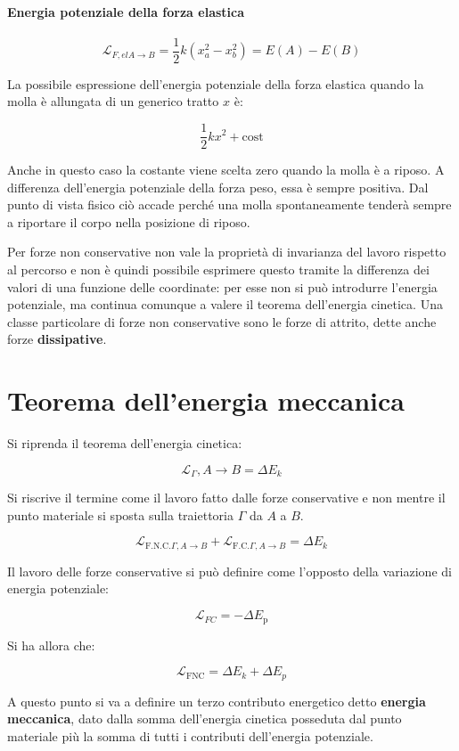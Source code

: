 \paragraph{Energia potenziale della forza elastica}

\[
	\mathcal{L}_{F,el A\to B}=\frac{1}{2}k(x_a^2-x_b^2)=E(A)-E(B)
\]

La possibile espressione dell'energia potenziale della forza elastica quando la molla è allungata di un generico tratto $x$ è:

\[
	\frac{1}{2}kx^2+\text{cost}
\]

Anche in questo caso la costante viene scelta zero quando la molla è a riposo. A differenza dell'energia potenziale della forza peso, essa è sempre positiva. Dal punto di vista fisico ciò accade perché una molla spontaneamente tenderà sempre a riportare il corpo nella posizione di riposo.

Per forze non conservative non vale la proprietà di invarianza del lavoro rispetto al percorso e non è quindi possibile esprimere questo tramite la differenza dei valori di una funzione delle coordinate: per esse non si può introdurre l'energia potenziale, ma continua comunque a valere il teorema dell'energia cinetica. Una classe particolare di forze non conservative sono le forze di attrito, dette anche forze \textbf{dissipative}.

\section{Teorema dell'energia meccanica}

Si riprenda il teorema dell'energia cinetica:

\[
	\mathcal{L}_\Gamma, A\to B= \Delta E_k
\]

Si riscrive il termine come il lavoro fatto dalle forze conservative e non mentre il punto materiale si sposta sulla traiettoria $\Gamma$ da $A$ a $B$.

\[
	\mathcal{L}_{\text{F.N.C.} \Gamma, A \to B}+\mathcal{L}_{\text{F.C.} \Gamma, A \to B}=\Delta E_k
\]

Il lavoro delle forze conservative si può definire come l'opposto della variazione di energia potenziale:

\[
	\mathcal{L}_{FC}=-\Delta E_{\text{p}}
\]

Si ha allora che:

\[
	\boxed{\mathcal{L}_{\text{FNC}}=\Delta E_k + \Delta E_p}
\]

A questo punto si va a definire un terzo contributo energetico detto \textbf{energia meccanica}, dato dalla somma dell'energia cinetica posseduta dal punto materiale più la somma di tutti i contributi dell'energia potenziale.

